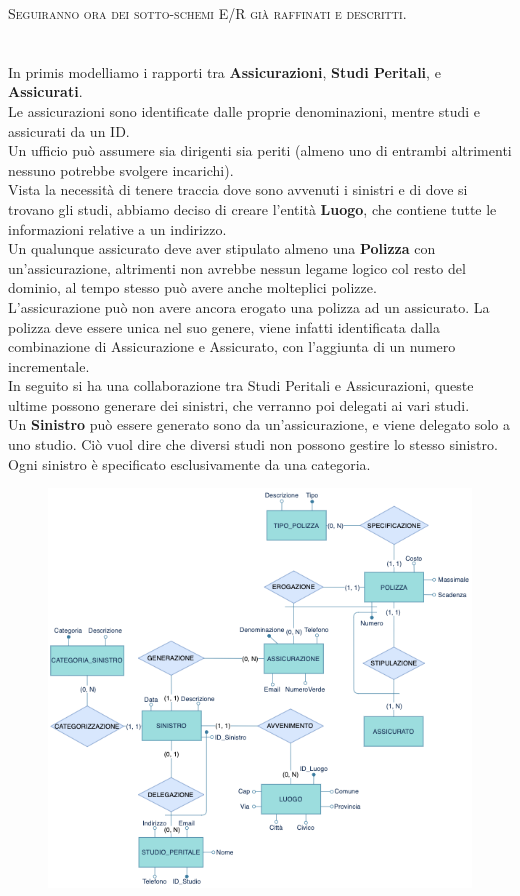 \documentclass[a4paper,12pt]{report}
\begin{document}
\textsc{Seguiranno ora dei sotto-schemi E/R già raffinati e descritti.}
\\
\\
\\
In primis modelliamo i rapporti tra \textbf{Assicurazioni}, \textbf{Studi Peritali}, e \textbf{Assicurati}.
\\
Le assicurazioni sono identificate dalle proprie denominazioni, mentre studi e assicurati da un ID.
\\
Un ufficio può assumere sia dirigenti sia periti (almeno uno di 
entrambi altrimenti nessuno potrebbe svolgere incarichi).
\\
Vista la necessità di tenere traccia dove sono avvenuti i sinistri e di dove si trovano gli studi, abbiamo deciso di creare l’entità \textbf{Luogo}, che contiene tutte le informazioni relative a un indirizzo.
\\
Un qualunque assicurato deve aver stipulato almeno una \textbf{Polizza} con un’assicurazione, altrimenti non avrebbe nessun legame logico col resto del dominio, al tempo stesso può avere anche molteplici polizze.
\\
L’assicurazione può non avere ancora erogato una polizza ad un assicurato. La polizza deve essere unica nel suo genere, viene infatti identificata dalla combinazione di Assicurazione e Assicurato, con l’aggiunta di un numero incrementale.
\\
In seguito si ha una collaborazione tra Studi Peritali e Assicurazioni, queste ultime possono generare dei sinistri, che verranno poi delegati ai vari studi.
\\
Un \textbf{Sinistro} può essere generato sono da un'assicurazione, e viene delegato solo a uno studio. Ciò vuol dire che diversi studi non possono gestire lo stesso sinistro.
Ogni sinistro è specificato esclusivamente da una categoria.
\\
\begin{figure}[ht]
    \begin{center}
        \centering
        \includegraphics[width=\textwidth]{img/Assicurazione.png}
    \end{center}
\end{figure}
\end{document}
